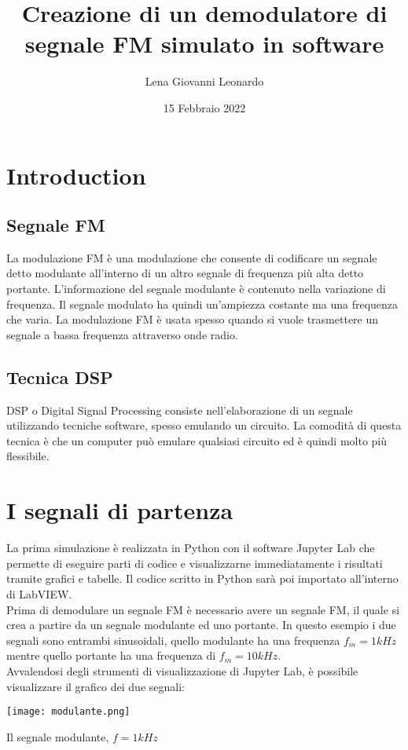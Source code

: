 \documentclass{article}
\title{Creazione di un demodulatore di segnale FM simulato in software}
\author{Lena Giovanni Leonardo}
\date{15 Febbraio 2022}
\begin{document}
\maketitle

\section{Introduction}

\subsection{Segnale FM}
La modulazione FM è una modulazione che consente di codificare un segnale detto modulante all'interno di un altro segnale di frequenza
più alta detto portante. L'informazione del segnale modulante è contenuto nella variazione di frequenza. Il segnale modulato
ha quindi un'ampiezza costante ma una frequenza che varia. La modulazione FM è usata spesso quando si vuole trasmettere un segnale
a bassa frequenza attraverso onde radio.

\subsection{Tecnica DSP}
DSP o Digital Signal Processing consiste nell'elaborazione di un segnale utilizzando tecniche software, spesso emulando un circuito.
La comodità di questa tecnica è che un computer può emulare qualsiasi circuito ed è quindi molto più flessibile.

\section{I segnali di partenza}
La prima simulazione è realizzata in Python con il software Jupyter Lab che permette di eseguire 
parti di codice e visualizzarne immediatamente i risultati tramite grafici e tabelle. Il codice 
scritto in Python sarà poi importato all'interno di LabVIEW.
\\
Prima di demodulare un segnale FM è necessario avere un segnale FM, il quale si crea a partire da un segnale 
modulante ed uno portante. In questo esempio i due segnali sono entrambi sinusoidali, quello modulante ha una 
frequenza $f_m = 1 kHz$ mentre quello portante ha una frequenza di $f_m = 10 kHz$.
\\
Avvalendosi degli strumenti di visualizzazione di Jupyter Lab, è possibile visualizzare il grafico dei due segnali:
\\
\begin{center}
    \texttt{[image: modulante.png]}
\end{center}
Il segnale modulante, $f = 1 kHz$
\end{document}
